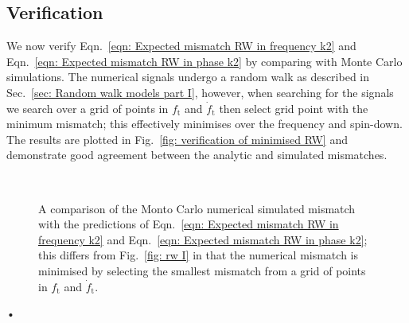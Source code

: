 \subsection{Verification}

We now verify Eqn.~\eqref{eqn: Expected mismatch RW in frequency k2} and
Eqn.~\eqref{eqn: Expected mismatch RW in phase k2} by comparing with Monte
Carlo simulations. The numerical signals undergo a random walk as described in
Sec.~\ref{sec: Random walk models part I}, however, when searching for the
signals we search over a grid of points in $f_\textrm{t}$ and $\dot{f}_\textrm{t}$ then select grid point
with the minimum mismatch; this effectively minimises over the frequency and
spin-down. The results are plotted in Fig.~\ref{fig: verification of
minimised RW} and demonstrate good agreement between the analytic and simulated
mismatches.

\begin{figure}[ht]
\centering
{}
\\
\caption{A comparison of the Monto Carlo numerical simulated mismatch with the
predictions of Eqn.~\eqref{eqn: Expected mismatch RW in
frequency k2} and Eqn.~\eqref{eqn: Expected mismatch RW in phase k2}; this differs
from Fig.~\ref{fig: rw I} in that the numerical mismatch is minimised by selecting
the smallest mismatch from a grid of points in $f_\textrm{t}$ and $\dot{f}_\textrm{t}$.}
\label{fig: verification of minimised RW}
\end{figure}•
\FloatBarrier
